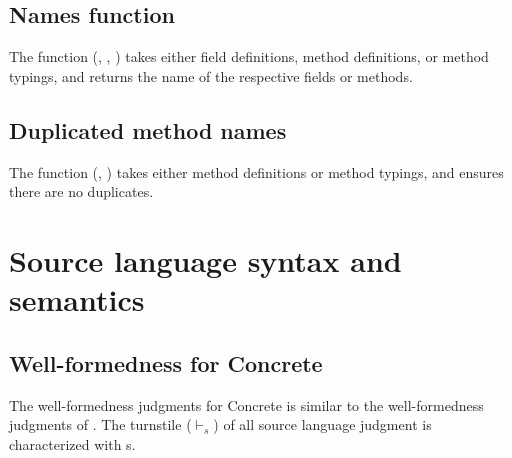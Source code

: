 \documentclass[runnningheads]{tex/llncs}
\begin{document}
\begin{mathpar}

\end{mathpar}

\subsection{Names function}

The  function (, , ) takes either field definitions, method definitions, or 
method typings, and returns the name of the respective fields or methods.

\subsection{Duplicated method names}

The  function (, ) takes either
method definitions or method typings, and ensures there are no duplicates.


\section{Source language syntax and semantics}

\subsection*{Well-formedness for Concrete}

The well-formedness judgments for Concrete is similar to the well-formedness
judgments of \kafka. The turnstile ($\vdash_{\!s}$) of all source language judgment is
characterized with s.
\end{document}

